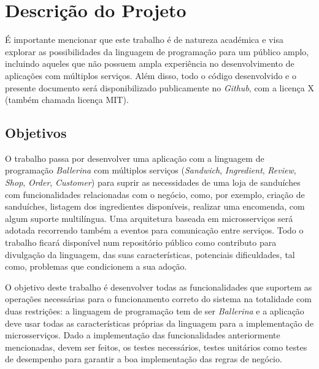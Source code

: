 
\section{Descrição do Projeto}
\label{sec:Ch1.2}

É importante mencionar que este trabalho é de natureza académica e visa explorar as possibilidades da linguagem de programação para um público amplo, incluindo aqueles que não possuem ampla experiência no desenvolvimento de aplicações com múltiplos serviços. Além disso, todo o código desenvolvido e o presente documento será disponibilizado publicamente no \textit{Github}, com a licença X (também chamada licença MIT).



\subsection{Objetivos}
\label{sub:Ch1.2.1}

O trabalho passa por desenvolver uma aplicação com a linguagem de programação \textit{Ballerina} com múltiplos serviços (\textit{Sandwich}, \textit{Ingredient}, \textit{Review}, \textit{Shop}, \textit{Order}, \textit{Customer}) para suprir as necessidades de uma loja de sanduíches com funcionalidades relacionadas com o negócio, como, por exemplo, criação de sanduíches, listagem dos ingredientes disponíveis, realizar uma encomenda, com algum suporte multilíngua. Uma arquitetura baseada em microsserviços será adotada recorrendo também a eventos para comunicação entre serviços.
Todo o trabalho ficará disponível num repositório público como contributo para divulgação da linguagem, das suas características, potenciais dificuldades, tal como, problemas que condicionem a sua adoção.

O objetivo deste trabalho é desenvolver todas as funcionalidades que suportem as operações necessárias para o funcionamento correto do sistema na totalidade com duas restrições: a linguagem de programação tem de ser \textit{Ballerina} e a aplicação deve usar todas as características próprias da linguagem para a implementação de microsserviços. Dado a implementação das funcionalidades anteriormente mencionadas, devem ser feitos, os testes necessários, testes unitários como testes de desempenho para garantir a boa implementação das regras de negócio.


